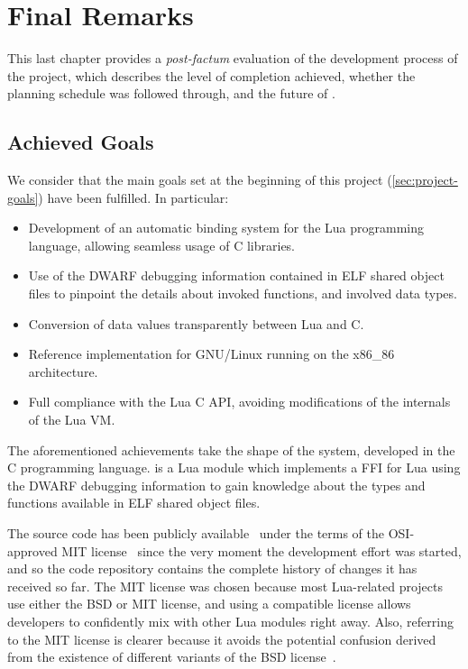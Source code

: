\cleardoublepage
\setchaptertoc
\chapter{Final Remarks}

This last chapter provides a \emph{post-factum} evaluation of the development
process of the project, which describes the level of completion achieved,
whether the planning schedule was followed through, and the future of \Eol*.
\afterintro

\section{Achieved Goals}

We consider that the main goals set at the beginning of this project
(\autoref{sec:project-goals}) have been fulfilled. In particular:

\begin{itemize}

	\item Development of an automatic binding system for the Lua programming
	language, allowing seamless usage of C libraries.

	\item Use of the DWARF debugging information contained in ELF shared object
	files to pinpoint the details about invoked functions, and involved data
	types.

	\item Conversion of data values transparently between Lua and C.

	\item Reference implementation for GNU/Linux running on the
	x86\_86 architecture.

	\item Full compliance with the Lua C API, avoiding modifications of the
		internals of the Lua VM.

\end{itemize}

The aforementioned achievements take the shape of the \Eol* system, developed
in the C programming language. \Eol* is a Lua module which implements a FFI
for Lua using the DWARF debugging information to gain knowledge about the
types and functions available in ELF shared object files.

The source code has been publicly available~\cite{eol-github} under the terms
of the \gls{OSI}-approved MIT license~\cite{mit-license} since the very moment the development
effort was started, and so the code repository contains the complete history
of changes it has received so far. The MIT license was chosen because most
Lua-related projects use either the BSD or MIT license, and using a compatible
license allows developers to confidently mix \Eol* with other Lua modules
right away. Also, referring to the MIT license is clearer because it avoids
the potential confusion derived from the existence of different variants of
the BSD license~\cite{bsd-licenses}.

